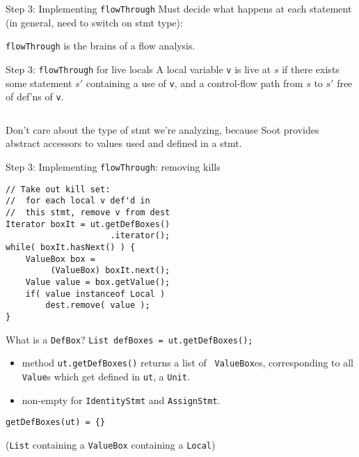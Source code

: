 \begin{slide}{Step 3: Implementing {\tt flowThrough}}
Must decide what happens at each statement (in general, need to switch
on stmt type):
\begin{center}
\scalebox{1.3}{
}
\end{center}
{\tt flowThrough} is the brains of a flow analysis.
\end{slide}

\begin{slide}{Step 3: {\tt flowThrough} for live locals}
\vspace*{0.1in}
A local variable {\tt v} is {\red live} at $s$ if there exists some
statement $s'$ containing a use of {\tt v},
and a control-flow path from $s$ to $s'$ free
of def'ns of {\tt v}.

$\quad$

Don't care about the type of stmt we're analyzing, because Soot
provides abstract accessors to values used and defined in a stmt.

\end{slide}

\begin{slide}{Step 3: Implementing {\tt flowThrough}: removing kills}
\begin{verbatim}
// Take out kill set:
//  for each local v def'd in 
//  this stmt, remove v from dest
Iterator boxIt = ut.getDefBoxes()
                     .iterator();
while( boxIt.hasNext() ) {
    ValueBox box = 
         (ValueBox) boxIt.next();
    Value value = box.getValue();
    if( value instanceof Local )
        dest.remove( value );
}
\end{verbatim}
\end{slide}

\begin{slide}{What is a {\tt DefBox}?}
\vspace*{-0.1in}
{\tt List defBoxes = ut.getDefBoxes();}

\vspace*{-0.05in}
\begin{itemize}
\item method {\red \tt ut.getDefBoxes()} returns a list of {\tt
ValueBox}es, corresponding to all {\tt Value}s which get defined
in {\tt ut}, a {\tt Unit}. 

\item non-empty for {\tt IdentityStmt} and {\tt AssignStmt}.
\end{itemize}

\vspace*{-0.08in}
\begin{center}
\end{center}

\vspace*{0.05in}
{\tt getDefBoxes(ut) = \{\}}\\
\qquad \qquad \begin{minipage}{0.7\textwidth} 
({\tt List} containing a {\tt ValueBox} containing a {\tt Local})
\end{minipage}

\end{slide}

